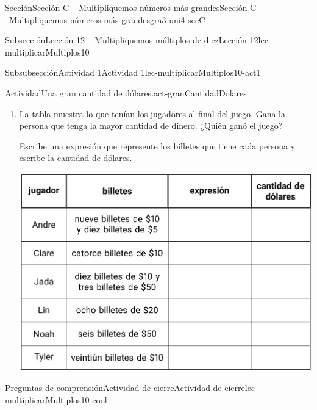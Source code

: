 \begin{sectionptx}{Sección}{Sección C -~Multipliquemos números más grandes}{}{Sección C -~Multipliquemos números más grandes}{}{}{gra3-uni4-secC}
\begin{subsectionptx}{Subsección}{Lección 12 -~Multipliquemos múltiplos de diez}{}{Lección 12}{}{}{lec-multiplicarMultiplos10}
\begin{subsubsectionptx}{Subsubsección}{Actividad 1}{}{Actividad 1}{}{}{lec-multiplicarMultiplos10-act1}
\begin{activity}{Actividad}{Una gran cantidad de dólares.}{act-granCantidadDolares}
\begin{enumerate}
\begin{enumerate}
\begin{image}{0}{1}{0}{}
\end{image}%
\item{}Escribe una expresión para cada forma en la que Noah podría haberle pagado a Lin.%
\end{enumerate}
\clearpage
\item{}La tabla muestra lo que tenían los jugadores al final del juego. Gana la persona que tenga la mayor cantidad de dinero. ¿Quién ganó el juego?%
\par
Escribe una expresión que represente los billetes que tiene cada persona y escribe la cantidad de dólares.%
\begin{image}{0}{1}{0}{}%
\includegraphics[max width=\linewidth, center]{external/tikz-source/unaGranCantidadDeDolares-tab2.pdf}
\end{image}%
\end{enumerate}
\end{activity}%
\end{subsubsectionptx}
%
%
\typeout{************************************************}
\typeout{************************************************}
%
\begin{reading-questions-subsubsection}{Preguntas de comprensión}{Actividad de cierre}{}{Actividad de cierre}{}{}{lec-multiplicarMultiplos10-cool}
%
\end{reading-questions-subsubsection}
\end{subsectionptx}
%
%
\typeout{************************************************}

\end{sectionptx}
